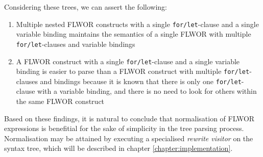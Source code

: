 Considering these trees, we can assert the following:
\begin{enumerate}
  \item Multiple nested FLWOR constructs with a single \texttt{for/let}-clause
  and a single variable binding maintains the semantics of a single FLWOR with
  multiple \texttt{for/let}-clauses and variable bindings
  \item A FLWOR construct with a single \texttt{for/let}-clause and a single
  variable binding is easier to parse than a FLWOR construct with multiple
  \texttt{for/let}-clauses and bindings because it is known that there is only
  one \texttt{for/let}-clause with a variable binding, and there is no need to
  look for others within the same FLWOR construct
\end{enumerate}

Based on these findings, it is natural to conclude that normalisation of FLWOR
expressions is benefitial for the sake of simplicity in the tree parsing
process. Normalisation may be attained by executing a specialised
\textit{rewrite visitor} on the syntax tree, which will be described in
chapter \ref{chapter:implementation}.
